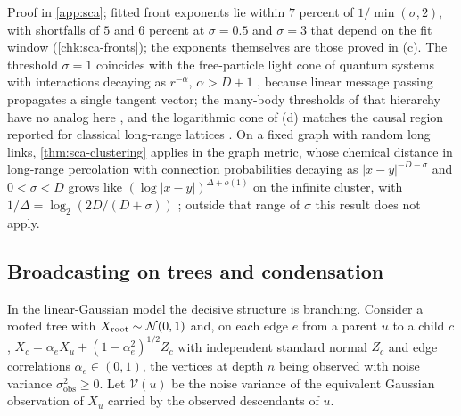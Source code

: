 Proof in \cref{app:sca}; fitted front exponents lie within $7$ percent of $1/\min(\sigma,2)$, with shortfalls of $5$ and $6$ percent at $\sigma=0.5$ and $\sigma=3$ that depend on the fit window (\cref{chk:sca-fronts}); the exponents themselves are those proved in (c). The threshold $\sigma=1$ coincides with the free-particle light cone of quantum systems with interactions decaying as $r^{-\alpha}$, $\alpha>D+1$ \citep{tran2020hierarchy}, because linear message passing propagates a single tangent vector; the many-body thresholds of that hierarchy have no analog here \citep{kuwahara2020strictly}, and the logarithmic cone of (d) matches the causal region reported for classical long-range lattices \citep{metivier2014spreading}. On a fixed graph with random long links, \cref{thm:sca-clustering} applies in the graph metric, whose chemical distance in long-range percolation with connection probabilities decaying as $|x-y|^{-D-\sigma}$ and $0<\sigma<D$ grows like $(\log|x-y|)^{\Delta+o(1)}$ on the infinite cluster, with $1/\Delta=\log_2(2D/(D+\sigma))$ \citep{biskup2004scaling}; outside that range of $\sigma$ this result does not apply.

\subsection{Broadcasting on trees and condensation}\label{sup:sca-broadcasting-on-trees-and-condensation}

In the linear-Gaussian model the decisive structure is branching. Consider a rooted tree with $X_{\mathrm{root}}\sim\mathcal{N}(0,1)$ and, on each edge $e$ from a parent $u$ to a child $c$, $X_c=\alpha_eX_u+(1-\alpha_e^2)^{1/2}Z_c$ with independent standard normal $Z_c$ and edge correlations $\alpha_e\in(0,1)$, the vertices at depth $n$ being observed with noise variance $\sigma_{\mathrm{obs}}^2\ge0$. Let $\mathcal V(u)$ be the noise variance of the equivalent Gaussian observation of $X_u$ carried by the observed descendants of $u$.

